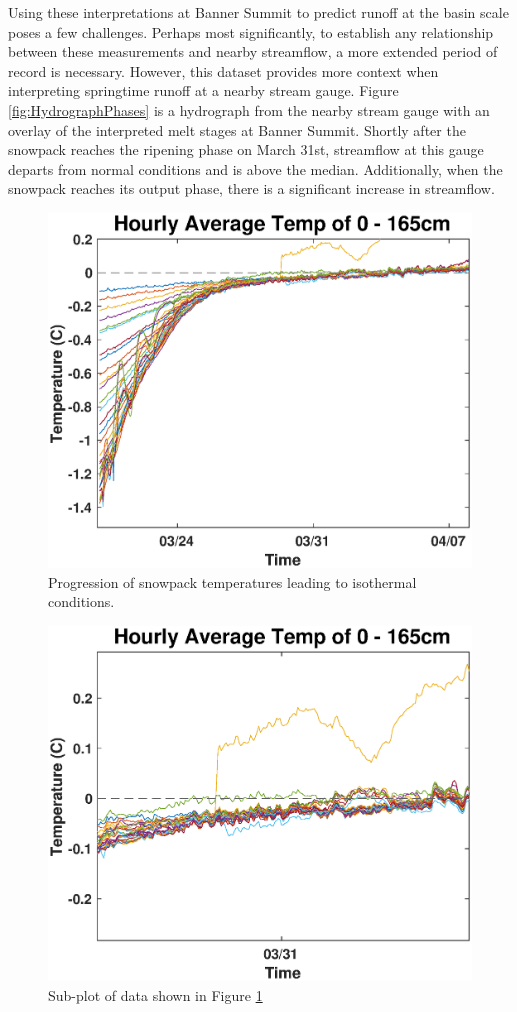 Using these interpretations at Banner Summit to predict runoff at the basin scale poses a few challenges.  Perhaps most significantly, to establish any relationship between these measurements and nearby streamflow, a more extended period of record is necessary. However, this dataset provides more context when interpreting springtime runoff at a nearby stream gauge. Figure \ref{fig:HydrographPhases} is a hydrograph from the nearby stream gauge with an overlay of the interpreted melt stages at Banner Summit. Shortly after the snowpack reaches the ripening phase on March 31st, streamflow at this gauge departs from normal conditions and is above the median. Additionally, when the snowpack reaches its output phase, there is a significant increase in streamflow.

\begin{figure}
    \centering
    \includegraphics[width=0.7\linewidth]{figures/TCArray/0_165cm_Isothermal.eps}
    \caption{Progression of snowpack temperatures leading to isothermal conditions.}
    \label{fig:0_135cm_Isothermal}
 \end{figure}
 
 \begin{figure}
    \centering
    \includegraphics[width=0.7\linewidth]{figures/TCArray/0_165cm_Isothermal_sub.eps}
    \caption{Sub-plot of data shown in Figure \ref{fig:0_135cm_Isothermal}}
    \label{fig:0_135cm_Zoom}
 \end{figure}
 
